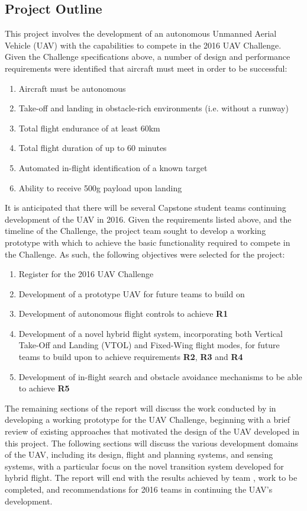 \subsection{Project Outline}
This project involves the development of an autonomous Unmanned Aerial Vehicle (UAV) with the capabilities to compete in the 2016 UAV Challenge. Given the Challenge specifications above, a number of design and performance requirements were identified that aircraft must meet in order to be successful:
\begin{enumerate}[label=\bfseries R\arabic*:] \itemsep-2pt
	\item Aircraft must be autonomous
	\item Take-off and landing in obstacle-rich environments (i.e. without a runway)
	\item Total flight endurance of at least 60km
	\item Total flight duration of up to 60 minutes
	\item Automated in-flight identification of a known target
	\item Ability to receive 500g payload upon landing
\end{enumerate}

It is anticipated that there will be several Capstone student teams continuing development of the UAV in 2016. Given the requirements listed above, and the timeline of the Challenge, the \ID project team sought to develop a working prototype with which to achieve the basic functionality required to compete in the Challenge. As such, the following objectives were selected for the project:
\begin{enumerate}[label=\bfseries O\arabic*:] \itemsep-2pt
	\item Register for the 2016 UAV Challenge
	\item Development of a prototype UAV for future teams to build on
	\item Development of autonomous flight controls to achieve \textbf{R1}
	\item Development of a novel hybrid flight system, incorporating both Vertical Take-Off and Landing (VTOL) and Fixed-Wing flight modes, for future teams to build upon to achieve requirements \textbf{R2}, \textbf{R3} and \textbf{R4}
	\item Development of in-flight search and obstacle avoidance mechanisms to be able to achieve \textbf{R5}
\end{enumerate}

The remaining sections of the report will discuss the work conducted by \ID in developing a working prototype for the UAV Challenge, beginning with a brief review of existing approaches that motivated the design of the UAV developed in this project. The following sections will discuss the various development domains of the UAV, including its design, flight and planning systems, and sensing systems, with a particular focus on the novel transition system developed for hybrid flight. The report will end with the results achieved by team \ID, work to be completed, and recommendations for 2016 teams in continuing the UAV's development.

